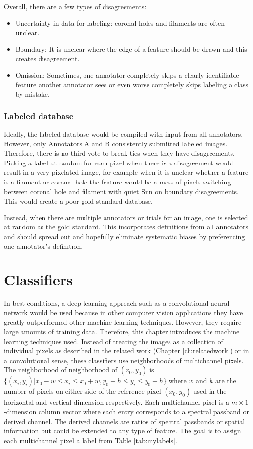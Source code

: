 \documentclass[twoside]{report}
\begin{document}
Overall, there are a few types of disagreements:
\begin{itemize}
\item Uncertainty in data for labeling: coronal holes and filaments are often unclear. 
\item Boundary: It is unclear where the edge of a feature should be drawn and this creates disagreement. 
\item Omission: Sometimes, one annotator completely skips a clearly identifiable feature another annotator sees or even worse completely skips labeling a class by mistake. 
\end{itemize}

\subsection{Labeled database}
Ideally, the labeled database would be compiled with input from all annotators. However, only Annotators A and B consistently submitted labeled images. Therefore, there is no third vote to break ties when they have disagreements. Picking a label at random for each pixel when there is a disagreement would result in a very pixelated image, for example when it is unclear whether a feature is a filament or coronal hole the feature would be a mess of pixels switching between coronal hole and filament with quiet Sun on boundary disagreements. This would create a poor gold standard database.

Instead, when there are multiple annotators or trials for an image, one is selected at random as the gold standard. This incorporates definitions from all annotators and should spread out and hopefully eliminate systematic biases by preferencing one annotator's definition. 


\chapter{Classifiers} \label{ch:classifiers}

In best conditions, a deep learning approach such as a convolutional neural network would be used because in other computer vision applications they have greatly outperformed other machine learning techniques. However, they require large amounts of training data. Therefore, this chapter introduces the machine learning techniques used. Instead of treating the images as a collection of individual pixels as described in the related work (Chapter \ref{ch:relatedwork}) or in a convolutional sense, these classifiers use neighborhoods of multichannel pixels. The neighborhood of neighborhood of $(x_0, y_0)$ is $\{(x_i, y_i) | x_0 - w \le x_i \le x_0 + w, y_0 - h \le y_i \le y_0 + h\}$  where $w$ and $h$ are the number of pixels on either side of the reference pixel $(x_0, y_0)$ used in the horizontal and vertical dimension respectively. Each multichannel pixel is a $m \times 1$-dimension column vector where each entry corresponds to a spectral passband or derived channel. The derived channels are ratios of spectral passbands or spatial information but could be extended to any type of feature. The goal is to assign each multichannel pixel a label from Table \ref{tab:mylabels}. 
\end{document}
